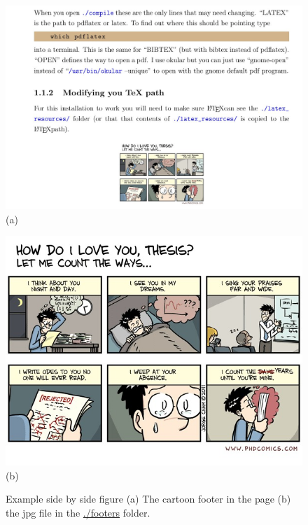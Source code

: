    \begin{figure}
    \begin{center}
    \begin{minipage}{.49\textwidth}
    \begin{center}
    \includegraphics[width=\textwidth]{./figures/phd_comics_example.jpg}
    \\(a)
    \end{center}
    \end{minipage}
    \begin{minipage}{.49\textwidth}
    \begin{center}
    \includegraphics[width=\textwidth]{./footers/1.jpg}
    \\(b)
    \end{center}
    \end{minipage}
    \end{center}
    \caption[Short title for the list of figures]{Example side by side figure (a) The cartoon footer in the page (b) the jpg file in the \protect\url{./footers} folder. \label{ch1_figure_example_of_side_by_side}}
    \end{figure}

